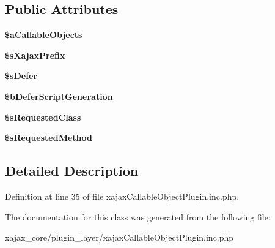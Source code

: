 \subsection*{Public Attributes}
\begin{DoxyCompactItemize}
\item 
\hypertarget{classxajaxCallableObjectPlugin_ae761106fd2899edce3c8c8e56e33da67}{
{\bfseries \$aCallableObjects}}
\label{classxajaxCallableObjectPlugin_ae761106fd2899edce3c8c8e56e33da67}

\item 
\hypertarget{classxajaxCallableObjectPlugin_ac52b3d0abe9e5483fc7e30a06842355d}{
{\bfseries \$sXajaxPrefix}}
\label{classxajaxCallableObjectPlugin_ac52b3d0abe9e5483fc7e30a06842355d}

\item 
\hypertarget{classxajaxCallableObjectPlugin_a597197722daf750ee4b69fa89a6b769b}{
{\bfseries \$sDefer}}
\label{classxajaxCallableObjectPlugin_a597197722daf750ee4b69fa89a6b769b}

\item 
\hypertarget{classxajaxCallableObjectPlugin_ae374d1c650d28b7d87bf7fbbf17a3141}{
{\bfseries \$bDeferScriptGeneration}}
\label{classxajaxCallableObjectPlugin_ae374d1c650d28b7d87bf7fbbf17a3141}

\item 
\hypertarget{classxajaxCallableObjectPlugin_ac6b7080f7d33d3b0305ba8421a7d9951}{
{\bfseries \$sRequestedClass}}
\label{classxajaxCallableObjectPlugin_ac6b7080f7d33d3b0305ba8421a7d9951}

\item 
\hypertarget{classxajaxCallableObjectPlugin_ac800f885085bb3cbd2d730d9644f4394}{
{\bfseries \$sRequestedMethod}}
\label{classxajaxCallableObjectPlugin_ac800f885085bb3cbd2d730d9644f4394}

\end{DoxyCompactItemize}


\subsection{Detailed Description}


Definition at line 35 of file xajaxCallableObjectPlugin.inc.php.



The documentation for this class was generated from the following file:\begin{DoxyCompactItemize}
\item 
xajax\_\-core/plugin\_\-layer/xajaxCallableObjectPlugin.inc.php\end{DoxyCompactItemize}
